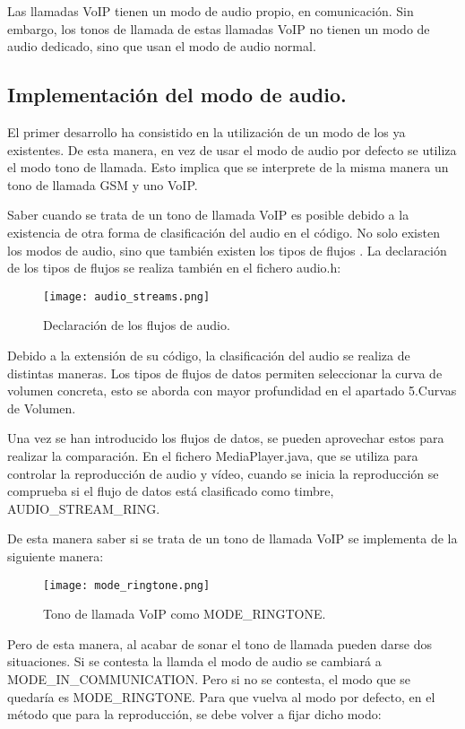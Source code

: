 Las llamadas \gls{VoIP} tienen un modo de audio propio, en comunicación. Sin embargo, los tonos de llamada de estas llamadas \gls{VoIP} no tienen un modo de audio dedicado, sino que usan el modo de audio normal.

\subsection{Implementación del modo de audio.}
El primer desarrollo ha consistido en la utilización de un modo de los ya existentes. De esta manera, en vez de usar el modo de audio por defecto se utiliza el modo tono de llamada. Esto implica que se interprete de la misma manera un tono de llamada \gls{GSM} y uno \gls{VoIP}.

Saber cuando se trata de un tono de llamada \gls{VoIP} es posible debido a la existencia de otra forma de clasificación del audio en el código. No solo existen los modos de audio, sino que también existen los tipos de flujos \cite{audio_manager}. La declaración de los tipos de flujos se realiza también en el fichero audio.h:

\begin{figure}[H]
	\centering
	\texttt{[image: audio\_streams.png]}
	\caption{Declaración de los flujos de audio.}
	\label{fig:audio_streams}
\end{figure}

Debido a la extensión de su código, la clasificación del audio se realiza de distintas maneras. Los tipos de flujos de datos permiten seleccionar la curva de volumen concreta, esto se aborda con mayor profundidad en el apartado 5.Curvas de Volumen. %

Una vez se han introducido los flujos de datos, se pueden aprovechar estos para realizar la comparación.  En el fichero MediaPlayer.java, que se utiliza para controlar la reproducción de audio y vídeo, cuando se inicia la reproducción se comprueba si el flujo de datos está clasificado como timbre, AUDIO\_STREAM\_RING. 

De esta manera saber si se trata de un tono de llamada \gls{VoIP} se implementa de la siguiente manera:

\begin{figure}[H]
	\centering
	\texttt{[image: mode\_ringtone.png]}
	\caption{Tono de llamada VoIP como MODE\_RINGTONE.}
	\label{fig:mode_ringtone}
\end{figure}

Pero de esta manera, al acabar de sonar el tono de llamada pueden darse dos situaciones. Si se contesta la llamda el modo de audio se cambiará a MODE\_IN\_COMMUNICATION. Pero si no se contesta, el modo que se quedaría es MODE\_RINGTONE. Para que vuelva al modo por defecto, en el método que para la reproducción, se debe volver a fijar dicho modo:

